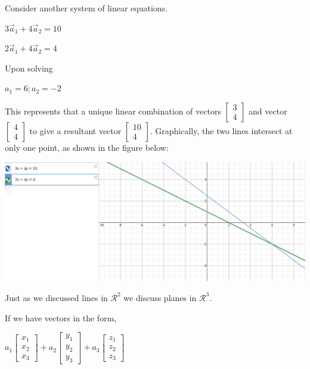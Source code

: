 \documentclass[a4paper, 11pt]{article}
\begin{document}
\begin{enumerate}
	Consider another system of linear equations.

	\begin{center}
	$3\vec a_1 + 4\vec a_2 = 10$ 

	$2\vec a_1 + 4\vec a_2 = 4$
	\end{center}  	
	
	Upon solving 
	\begin{center}
		$a_1 = 6; a_2 = -2$
	\end{center}
	
	This represents that a unique linear combination of vectors 
	$ \begin{bmatrix} 
		3 \\ 
		4
	\end{bmatrix}$
	and vector  
	$ \begin{bmatrix} 
		4 \\ 
		4 
	\end{bmatrix}$
	 to give a resultant vector
	 $ \begin{bmatrix} 
		10 \\ 
		4 
	\end{bmatrix}$.
	Graphically, the two lines intersect at only one point, as shown in the figure below:
	
	\begin{center}
  	\includegraphics[width=\linewidth]{images/unique_solution.PNG}
	\end{center}
	
	Just as we discussed lines in $\mathcal{R}^2$ we discuss planes in $\mathcal{R}^3$. 

	If we have vectors in the form,

	$ 
	a_1\begin{bmatrix} 
		x_1 \\ 
		x_2 \\
		x_3
	\end{bmatrix}
	+ 
	a_2\begin{bmatrix} 
		y_1 \\ 
		y_2 \\
		y_3
	\end{bmatrix}
	+
	a_3\begin{bmatrix} 
		z_1 \\ 
		z_2 \\
		z_3
	\end{bmatrix}
	$
	

\end{enumerate}
\end{document}
